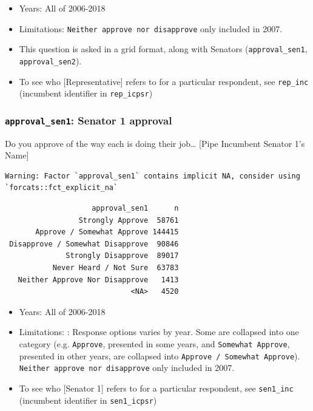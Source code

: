\documentclass[10pt,article,oneside]{memoir}
\theoremstyle{definition}
\begin{document}
\begin{itemize}
\tightlist
\item
  Years: All of 2006-2018
\item
  Limitations: \texttt{Neither\ approve\ nor\ disapprove} only included
  in 2007.
\item
  This question is asked in a grid format, along with Senators
  (\texttt{approval\_sen1}, \texttt{approval\_sen2}).
\item
  To see who {[}Representative{]} refers to for a particular respondent,
  see \texttt{rep\_inc} (incumbent identifier in \texttt{rep\_icpsr})
\end{itemize}

\hypertarget{approval_sen1-senator-1-approval}{%
\subsubsection{\texorpdfstring{\texttt{approval\_sen1}: Senator 1
approval}{approval\_sen1: Senator 1 approval}}\label{approval_sen1-senator-1-approval}}

Do you approve of the way each is doing their job\ldots{} {[}Pipe
Incumbent Senator 1's Name{]}

\begin{verbatim}
Warning: Factor `approval_sen1` contains implicit NA, consider using
`forcats::fct_explicit_na`
\end{verbatim}

\begin{verbatim}
                    approval_sen1      n
                 Strongly Approve  58761
       Approve / Somewhat Approve 144415
 Disapprove / Somewhat Disapprove  90846
              Strongly Disapprove  89017
           Never Heard / Not Sure  63783
   Neither Approve Nor Disapprove   1413
                             <NA>   4520
\end{verbatim}

\begin{itemize}
\tightlist
\item
  Years: All of 2006-2018
\item
  Limitations: : Response options varies by year. Some are collapsed
  into one category (e.g. \texttt{Approve}, presented in some years, and
  \texttt{Somewhat\ Approve}, presented in other years, are collapsed
  into \texttt{Approve\ /\ Somewhat\ Approve}).
  \texttt{Neither\ approve\ nor\ disapprove} only included in 2007.
\item
  To see who {[}Senator 1{]} refers to for a particular respondent, see
  \texttt{sen1\_inc} (incumbent identifier in \texttt{sen1\_icpsr})
\end{itemize}
\end{document}
